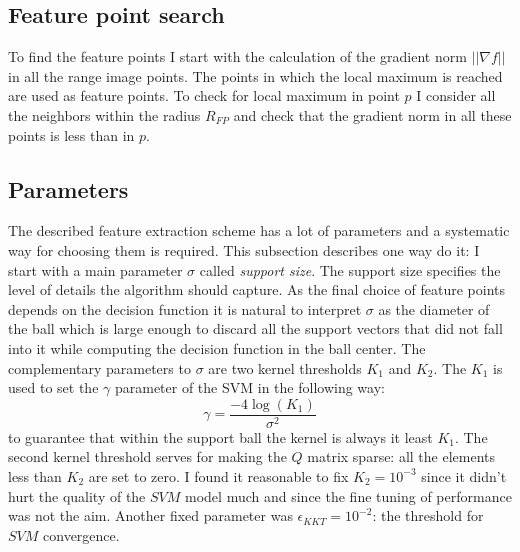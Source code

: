 \subsection{Feature point search}
To find the feature points I start with the calculation of the gradient norm $||\nabla f||$ in all the range image points. The points in which the local maximum is reached are used as feature points. To check for local maximum in point $p$ I consider all the neighbors within the radius $R_{FP}$ and check that the gradient norm in all these points is less than in $p$.

\subsection{Parameters}
\label{sec:params}
The described feature extraction scheme has a lot of parameters and a systematic way for choosing them is required. This subsection describes one way do it: I start with a main parameter $\sigma$ called \textit{support size}. The support size specifies the level of details the algorithm should capture. As the final choice of feature points depends on the decision function it is natural to interpret $\sigma$ as the diameter of the ball which is large enough to discard all the support vectors that did not fall into it while computing the decision function in the ball center. The complementary parameters to $\sigma$ are two kernel thresholds $K_1$ and $K_2$. The $K_1$ is used to set the $\gamma$ parameter of the SVM in the following way:
\begin{equation}
\gamma = \frac{-4 \log (K_1)}{\sigma^2}
\end{equation}
to guarantee that within the support ball the kernel is always it least $K_1$. The second kernel threshold serves for making the $Q$ matrix sparse: all the elements less than $K_2$ are set to zero. I found it reasonable to fix $K_2=10^{-3}$ since it didn't hurt the quality of the $SVM$ model much and since the fine tuning of performance was not the aim. Another fixed parameter was $\epsilon_{KKT}=10^{-2}$: the threshold for $SVM$ convergence.

